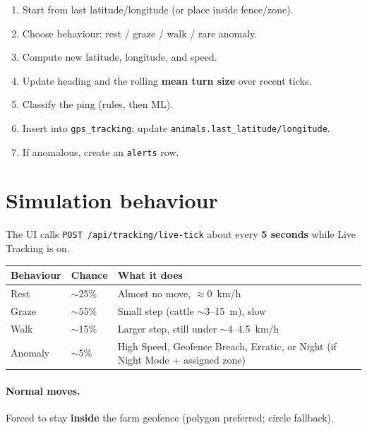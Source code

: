 \documentclass[11pt,a4paper]{article}
\begin{document}
\begin{enumerate}[leftmargin=*]
  \item Start from last latitude/longitude (or place inside fence/zone).
  \item Choose behaviour: rest / graze / walk / rare anomaly.
  \item Compute new latitude, longitude, and speed.
  \item Update heading and the rolling \textbf{mean turn size} over recent ticks.
  \item Classify the ping (rules, then ML).
  \item Insert into \texttt{gps\_tracking}; update \texttt{animals.last\_latitude/longitude}.
  \item If anomalous, create an \texttt{alerts} row.
\end{enumerate}

\section{Simulation behaviour}

The UI calls \texttt{POST /api/tracking/live-tick} about every \textbf{5 seconds}
while Live Tracking is on.

\begin{center}
\begin{tabular}{@{}llp{7.2cm}@{}}
\toprule
\textbf{Behaviour} & \textbf{Chance} & \textbf{What it does} \\
\midrule
Rest    & $\sim$25\% & Almost no move, $\approx 0$~km/h \\
Graze   & $\sim$55\% & Small step (cattle $\sim$3--15~m), slow \\
Walk    & $\sim$15\% & Larger step, still under $\sim$4--4.5~km/h \\
Anomaly & $\sim$5\%  & High Speed, Geofence Breach, Erratic,
                       or Night (if Night Mode + assigned zone) \\
\bottomrule
\end{tabular}
\end{center}

\paragraph{Normal moves.}
Forced to stay \textbf{inside} the farm geofence (polygon preferred; circle fallback).
\end{document}
